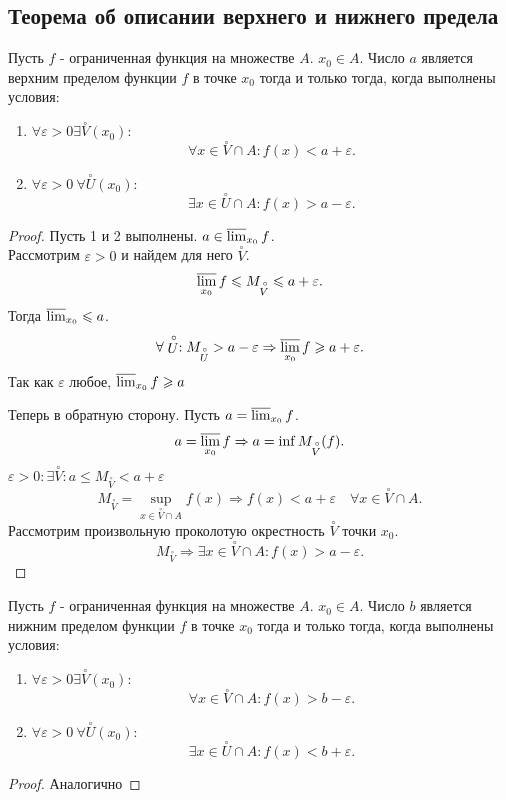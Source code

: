 \documentclass[11pt]{book}
\newcommand{\pivi}{\stackrel \circ }
\renewcommand{\le}{\leqslant}
\renewcommand{\ge}{\geqslant}
\theoremstyle{definition}
\theoremstyle{plain}
\theoremstyle{plain}
\theoremstyle{definition}
\theoremstyle{remark}
\begin{document}
\subsection{Теорема об описании верхнего и нижнего предела}\label{ques_31}
\begin{thm}
    Пусть $f$ - ограниченная функция на множестве $A$. $x_0 \in A$. Число $a$ является верхним пределом функции $f$ в точке $x_0$ тогда и только тогда, когда выполнены условия:
    \begin{enumerate}
	\item $\forall \varepsilon >0 \exists \pivi V (x_0):$ 
	    \[
		\forall x \in  \pivi V \cap A: f(x) < a + \varepsilon 
	    .\] 
	\item $\forall \varepsilon >0 ~ \forall \pivi  U(x_0):$
	    \[
		\exists x \in \pivi U\cap A: f(x) > a -\varepsilon 
	    .\] 
    \end{enumerate}
\end{thm}
\begin{proof}
    Пусть 1 и 2 выполнены. $a \in  \varlimsup_{x_0} f$.\\
    Рассмотрим $\varepsilon >0$ и найдем для него $\pivi V$.
    \[
	\varlimsup_{x_0}f \le  M_{\pivi V} \le a + \varepsilon 
    .\] 
Тогда $\varlimsup_{x_0} \le a$.
\[
    \forall \pivi U: M_{\pivi U} > a - \varepsilon  \Rightarrow \varlimsup_{x_0} f \ge  a+ \varepsilon 
.\] 
Так как $\varepsilon $ любое, $\varlimsup_{x_0} f \ge a$

Теперь в обратную сторону. Пусть $a = \varlimsup_{x_0} f$.
\[
    a = \varlimsup_{x_0} f \Rightarrow a = 
    \inf M_{\pivi V} (f)
.\] 
$\varepsilon >0 : \exists \pivi V: a \le M_{\pivi V} < a+ \varepsilon $
\[
    M_{\pivi V} = \sup\limits_{x \in \pivi V \cap A} f(x) \Rightarrow f(x) < a + \varepsilon \quad \forall x \in \pivi V \cap A
.\] 
Рассмотрим произвольную проколотую окрестность $\pivi  V$ точки $x_0$.
\[
    M_{\pivi V} \Rightarrow  \exists x \in  \pivi V \cap A: f(x) > a- \varepsilon 
.\] 
\end{proof}
\begin{thm}
    Пусть $f$ - ограниченная функция на множестве $A$. $x_0 \in A$. Число $b$ является нижним пределом функции $f$ в точке $x_0$ тогда и только тогда, когда выполнены условия:
    \begin{enumerate}
	\item $\forall \varepsilon >0 \exists \pivi V (x_0):$ 
	    \[
		\forall x \in  \pivi V \cap A: f(x) > b - \varepsilon 
	    .\] 
	\item $\forall \varepsilon >0 ~ \forall \pivi  U(x_0):$
	    \[
		\exists x \in \pivi U\cap A: f(x) < b + \varepsilon 
	    .\] 
    \end{enumerate}
\end{thm}
\begin{proof}
    Аналогично
\end{proof}
\end{document}
